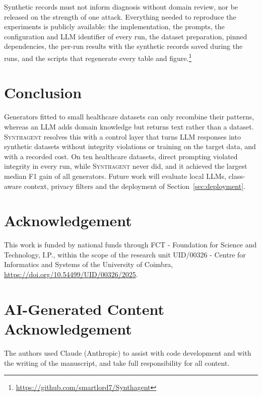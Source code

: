 \documentclass[conference]{IEEEtran}
\newcommand{\system}{\textsc{Synthagent}\xspace}
\begin{document}
Synthetic records must not inform diagnosis without domain review, nor be released on the strength of one attack. Everything needed to reproduce the experiments is publicly available: the implementation, the prompts, the configuration and LLM identifier of every run, the dataset preparation, pinned dependencies, the per-run results with the synthetic records saved during the runs, and the scripts that regenerate every table and figure.\footnote{\url{https://github.com/smartlord7/Synthagent}}

\section{Conclusion}
\label{sec:conclusion}
Generators fitted to small healthcare datasets can only recombine their patterns, whereas an LLM adds domain knowledge but returns text rather than a dataset. \system resolves this with a control layer that turns LLM responses into synthetic datasets without integrity violations or training on the target data, and with a recorded cost. On ten healthcare datasets, direct prompting violated integrity in every run, while \system never did, and it achieved the largest median F1 gain of all generators. Future work will evaluate local LLMs, class-aware context, privacy filters and the deployment of Section~\ref{sec:deployment}.

\section*{Acknowledgement}
This work is funded by national funds through FCT - Foundation for Science and Technology, I.P., within the scope of the research unit UID/00326 - Centre for Informatics and Systems of the University of Coimbra, \url{https://doi.org/10.54499/UID/00326/2025}.

\section*{AI-Generated Content Acknowledgement}
The authors used Claude (Anthropic) to assist with code development and with the writing of the manuscript, and take full responsibility for all content.



\end{document}
